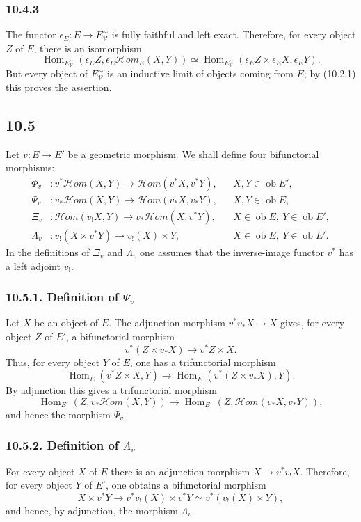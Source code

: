 \documentclass[11pt]{article}
\newcommand{\V}{\mathcal{V}}
\newcommand{\Hom}{\operatorname{Hom}}
\newcommand{\ob}{\operatorname{ob}}
\newcommand{\scrHom}{\mathscr{H}\!om}
\begin{document}
\subsubsection*{10.4.3}
The functor $\epsilon_E:E\to E^{\sim}_{\V}$ is fully faithful and left exact. Therefore, for every object $Z$ of $E$, there is an isomorphism
\[
\Hom_{E^{\sim}_{\V}}(\epsilon_EZ,\epsilon_E\scrHom_E(X,Y))\simeq
\Hom_{E^{\sim}_{\V}}(\epsilon_EZ\times\epsilon_EX,\epsilon_EY).
\]
But every object of $E^{\sim}_{\V}$ is an inductive limit of objects coming from $E$; by (10.2.1) this proves the assertion.

\subsection*{10.5}
Let $v:E\to E'$ be a geometric morphism. We shall define four bifunctorial morphisms:
\begin{align*}
\Phi_v&:v^*\scrHom(X,Y)\longrightarrow \scrHom(v^*X,v^*Y),
& &X,Y\in\ob E',\\
\Psi_v&:v_*\scrHom(X,Y)\longrightarrow \scrHom(v_*X,v_*Y),
& &X,Y\in\ob E,\\
\Xi_v&:\scrHom(v_!X,Y)\longrightarrow v_*\scrHom(X,v^*Y),
& &X\in\ob E,\ Y\in\ob E',\\
\Lambda_v&:v_!(X\times v^*Y)\longrightarrow v_!(X)\times Y,
& &X\in\ob E,\ Y\in\ob E'.
\end{align*}
In the definitions of $\Xi_v$ and $\Lambda_v$ one assumes that the inverse-image functor $v^*$ has a left adjoint $v_!$.

\subsubsection*{10.5.1. Definition of $\Psi_v$}
Let $X$ be an object of $E$. The adjunction morphism $v^*v_*X\to X$ gives, for every object $Z$ of $E'$, a bifunctorial morphism
\[
v^*(Z\times v_*X)\longrightarrow v^*Z\times X.
\]
Thus, for every object $Y$ of $E$, one has a trifunctorial morphism
\[
\Hom_E(v^*Z\times X,Y)\longrightarrow \Hom_E(v^*(Z\times v_*X),Y).
\]
By adjunction this gives a trifunctorial morphism
\[
\Hom_{E'}(Z,v_*\scrHom(X,Y))\longrightarrow
\Hom_{E'}(Z,\scrHom(v_*X,v_*Y)),
\]
and hence the morphism $\Psi_v$.

\subsubsection*{10.5.2. Definition of $\Lambda_v$}
For every object $X$ of $E$ there is an adjunction morphism $X\to v^*v_!X$. Therefore, for every object $Y$ of $E'$, one obtains a bifunctorial morphism
\[
X\times v^*Y\longrightarrow v^*v_!(X)\times v^*Y\simeq v^*(v_!(X)\times Y),
\]
and hence, by adjunction, the morphism $\Lambda_v$.
\end{document}
